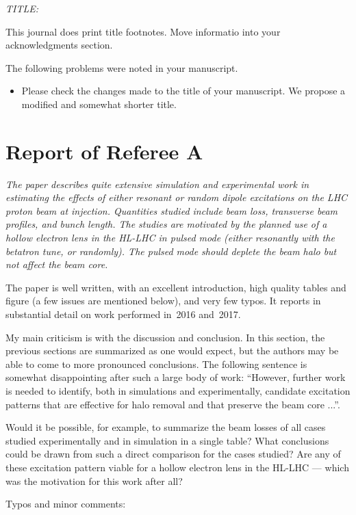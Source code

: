\documentclass[aps
,prstab
,preprint,tightenlines
,amsfonts,amssymb,amsmath
]{revtex4-1}
\begin{document}
{\em
TITLE:

This journal does print title footnotes.  Move informatio into your
acknowledgments section.

The following problems were noted in your manuscript.

\begin{itemize}
\item Please check the changes made to the title of your manuscript.
  We propose a modified and somewhat shorter title.
\end{itemize}
}

\section*{Report of Referee A}

{\em
The paper describes quite extensive simulation and experimental work 
in estimating the effects of either resonant or random dipole 
excitations on the LHC proton beam at injection. Quantities studied 
include beam loss, transverse beam profiles, and bunch length. The 
studies are motivated by the planned use of a hollow electron lens in 
the HL-LHC in pulsed mode (either resonantly with the betatron tune, 
or randomly). The pulsed mode should deplete the beam halo but not 
affect the beam core. 

The paper is well written, with an excellent introduction, high 
quality tables and figure (a few issues are mentioned below), and very 
few typos. It reports in substantial detail on work performed in~2016 
and~2017. 

My main criticism is with the discussion and conclusion. In this 
section, the previous sections are summarized as one would expect, but 
the authors may be able to come to more pronounced conclusions. The 
following sentence is somewhat disappointing after such a large body 
of work: ``However, further work is needed to identify, both in 
simulations and experimentally, candidate excitation patterns that are 
effective for halo removal and that preserve the beam core ...''. 

Would it be possible, for example, to summarize the beam losses of all
cases studied experimentally and in simulation in a single table? What
conclusions could be drawn from such a direct comparison for the cases
studied? Are any of these excitation pattern viable for a hollow
electron lens in the HL-LHC --- which was the motivation for this work
after all?

Typos and minor comments: 

}
\end{document}
